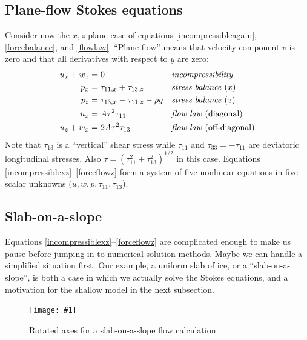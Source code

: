 \documentclass[letterpaper,final,12pt,reqno]{amsart}
\newcommand{\onefigsize}[3]{
\begin{figure}[ht]
\centering
\texttt{[image: \#1]}
\caption{#2}
\label{fig:#1}
\end{figure}}
\newcommand{\onefig}[2]{\onefigsize{#1}{#2}{3.0in}}
\begin{document}
\subsection*{Plane-flow Stokes equations}  Consider now the $x,z$-plane case of equations \eqref{incompressibleagain}, \eqref{forcebalance}, and \eqref{flowlaw}.  ``Plane-flow'' means that velocity component $v$ is zero and that all derivatives with respect to $y$ are zero:
\begin{align}
u_x + w_z &= 0 &&\text{\emph{incompressibility}} \label{incompressiblexz} \\
p_x &= \tau_{11,x} + \tau_{13,z} &&\text{\emph{stress balance} ($x$)} \label{stokespx} \\
p_z &= \tau_{13,x} - \tau_{11,z} - \rho g &&\text{\emph{stress balance} ($z$)} \label{stokespz} \\
u_x &= A \tau^2 \tau_{11} &&\text{\emph{flow law} (diagonal)}  \label{forceflowx} \\
u_z + w _x &= 2 A \tau^2 \tau_{13} &&\text{\emph{flow law} (off-diagonal)} \label{forceflowz}
\end{align}
Note that $\tau_{13}$ is a ``vertical'' shear stress while $\tau_{11}$ and $\tau_{33}=-\tau_{11}$ are deviatoric longitudinal stresses.  Also $\tau = (\tau_{11}^2+\tau_{13}^2)^{1/2}$ in this case.  Equations \eqref{incompressiblexz}--\eqref{forceflowz} form a system of five nonlinear equations in five scalar unknowns ($u,w,p,\tau_{11},\tau_{13}$).

\subsection*{Slab-on-a-slope}  Equations \eqref{incompressiblexz}--\eqref{forceflowz} are complicated enough to make us pause before jumping in to numerical solution methods.  Maybe we can handle a simplified situation first.  Our example, a uniform slab of ice, or a ``slab-on-a-slope'', is both a case in which we actually solve the Stokes equations, and a motivation for the shallow model in the next subsection.

\onefig{slab}{Rotated axes for a slab-on-a-slope flow calculation.}
\end{document}
